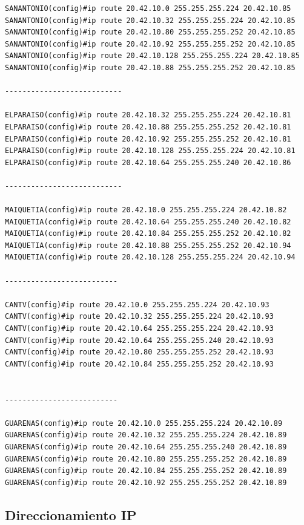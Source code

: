 \begin{verbatim}
SANANTONIO(config)#ip route 20.42.10.0 255.255.255.224 20.42.10.85
SANANTONIO(config)#ip route 20.42.10.32 255.255.255.224 20.42.10.85
SANANTONIO(config)#ip route 20.42.10.80 255.255.255.252 20.42.10.85
SANANTONIO(config)#ip route 20.42.10.92 255.255.255.252 20.42.10.85
SANANTONIO(config)#ip route 20.42.10.128 255.255.255.224 20.42.10.85
SANANTONIO(config)#ip route 20.42.10.88 255.255.255.252 20.42.10.85

---------------------------

ELPARAISO(config)#ip route 20.42.10.32 255.255.255.224 20.42.10.81
ELPARAISO(config)#ip route 20.42.10.88 255.255.255.252 20.42.10.81
ELPARAISO(config)#ip route 20.42.10.92 255.255.255.252 20.42.10.81
ELPARAISO(config)#ip route 20.42.10.128 255.255.255.224 20.42.10.81
ELPARAISO(config)#ip route 20.42.10.64 255.255.255.240 20.42.10.86

---------------------------

MAIQUETIA(config)#ip route 20.42.10.0 255.255.255.224 20.42.10.82
MAIQUETIA(config)#ip route 20.42.10.64 255.255.255.240 20.42.10.82
MAIQUETIA(config)#ip route 20.42.10.84 255.255.255.252 20.42.10.82
MAIQUETIA(config)#ip route 20.42.10.88 255.255.255.252 20.42.10.94
MAIQUETIA(config)#ip route 20.42.10.128 255.255.255.224 20.42.10.94

--------------------------

CANTV(config)#ip route 20.42.10.0 255.255.255.224 20.42.10.93
CANTV(config)#ip route 20.42.10.32 255.255.255.224 20.42.10.93
CANTV(config)#ip route 20.42.10.64 255.255.255.224 20.42.10.93
CANTV(config)#ip route 20.42.10.64 255.255.255.240 20.42.10.93
CANTV(config)#ip route 20.42.10.80 255.255.255.252 20.42.10.93
CANTV(config)#ip route 20.42.10.84 255.255.255.252 20.42.10.93


--------------------------

GUARENAS(config)#ip route 20.42.10.0 255.255.255.224 20.42.10.89
GUARENAS(config)#ip route 20.42.10.32 255.255.255.224 20.42.10.89
GUARENAS(config)#ip route 20.42.10.64 255.255.255.240 20.42.10.89
GUARENAS(config)#ip route 20.42.10.80 255.255.255.252 20.42.10.89
GUARENAS(config)#ip route 20.42.10.84 255.255.255.252 20.42.10.89
GUARENAS(config)#ip route 20.42.10.92 255.255.255.252 20.42.10.89
\end{verbatim}

\subsection{Direccionamiento IP}\label{direccionamiento-ip}

